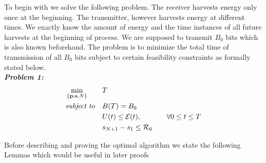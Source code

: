 To begin with we solve the following problem. The receiver harvests energy only once at the beginning. The transmitter, however harvests energy at different times. We exactly know the amount of energy and the time instances of all future harvests at the beginning of process.  We are supposed to transmit $B_0$ bits which is also known beforehand. The problem is to minimize the total time of transmission of all $B_0$ bits subject to certain feasibility constraints as formally stated below.\\
\textbf{\textit{Problem 1:}}
\begin{align}
&\min_{\{\textbf{p},\textbf{s},N\}}			&& T
\\
&\text{\textit{subject to}} 				&& B(T)=B_0
\\
&     										&& U(t)\le \mathcal{E}(t),  		&&& \forall 0\le t\le T
\\
&    										&& s_{N+1}-s_1\le \mathcal{R}_0
\end{align}

Before describing and proving the optimal algorithm we state the following Lemmas which would be useful in later proofs



